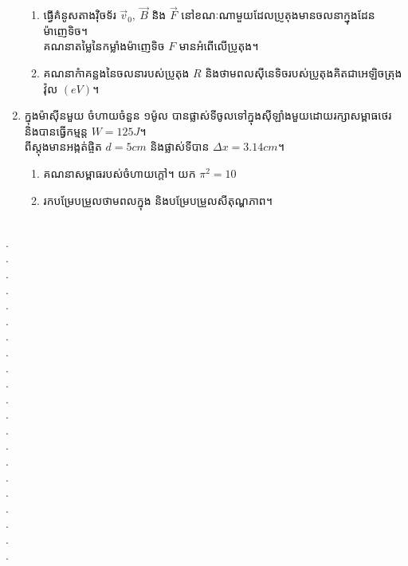 \documentclass{officialexam}
\begin{document}
\begin{enumerate}[I]
	\begin{enumerate}[k]
		\item ធ្វើគំនូសតាងវុិចទ័រ $\overrightarrow{v}_{0},~\overrightarrow{B}$ និង $\overrightarrow{F}$ នៅខណៈណាមួយដែលប្រូតុងមានចលនាក្នុងដែនម៉ាញេទិច។\\
		គណនាតម្លៃនៃកម្លាំងម៉ាញេទិច $F$ មានអំពើលើប្រូតុង។
		\item គណនាកំាគន្លងនៃចលនារបស់ប្រូតុង $R$ និងថាមពលសុីនេទិចរបស់ប្រូតុងគិតជាអេឡិចត្រុងវ៉ុល $\left(eV\right)$។
	\end{enumerate}
	\item ក្នុងម៉ាសុីនមួយ ចំហាយចំនួន ១ម៉ូល បានផ្លាស់ទីចូលទៅក្នុងសុីឡាំងមួយដោយរក្សាសម្ពាធថេរ និងបានធ្វើកម្មន្ត $W=125J$។ \\ពីស្តុងមានអង្កត់ផ្ចិត $d=5cm$ និងផ្លាស់ទីបាន $\Delta x=3.14cm$។
	\begin{enumerate}[k]
		\item គណនាសម្ពាធរបស់ចំហាយក្តៅ។ យក $\pi^{2}=10$
		\item រកបម្រែបម្រួលថាមពលក្នុង និងបម្រែបម្រួលសីតុណ្ហភាព។
	\end{enumerate}
\end{enumerate}
\\
{\color{white}.}\dotfill\\
{\color{white}.}\dotfill\\
{\color{white}.}\dotfill
\\
{\color{white}.}\dotfill\\
{\color{white}.}\dotfill\\
{\color{white}.}\dotfill
\\
{\color{white}.}\dotfill\\
{\color{white}.}\dotfill\\
{\color{white}.}\dotfill
\\
{\color{white}.}\dotfill\\
{\color{white}.}\dotfill\\
{\color{white}.}\dotfill
\\
{\color{white}.}\dotfill\\
{\color{white}.}\dotfill\\
{\color{white}.}\dotfill
\\
{\color{white}.}\dotfill\\
{\color{white}.}\dotfill\\
{\color{white}.}\dotfill
\\
{\color{white}.}\dotfill\\
{\color{white}.}\dotfill\\
{\color{white}.}\dotfill
\end{document}
